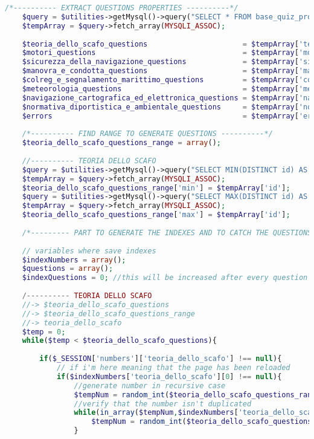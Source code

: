 \begin{lstlisting}[language=php]
	/*---------- EXTRACT QUESTIONS PROPERTIES ----------*/
	$query = $utilities->getMysql()->query("SELECT * FROM base_quiz_properties WHERE (id = '1')");
	$tempArray = $query->fetch_array(MYSQLI_ASSOC);
	
	$teoria_dello_scafo_questions                      = $tempArray['teoria_dello_scafo_questions'];
	$motori_questions                                  = $tempArray['motori_questions'];
	$sicurezza_della_navigazione_questions             = $tempArray['sicurezza_della_navigazione_questions'];
	$manovra_e_condotta_questions                      = $tempArray['manovra_e_condotta_questions'];
	$colreg_e_segnalamento_marittimo_questions         = $tempArray['colreg_e_segnalamento_marittimo_questions'];
	$meteorologia_questions                            = $tempArray['meteorologia_questions'];
	$navigazione_cartografica_ed_elettronica_questions = $tempArray['navigazione_cartografica_ed_elettronica_questions'];
	$normativa_diportistica_e_ambientale_questions     = $tempArray['normativa_diportistica_e_ambientale_questions'];
	$errors                                            = $tempArray['errors'];
	
	/*---------- FIND RANGE TO GENERATE QUESTIONS ----------*/
	$teoria_dello_scafo_questions_range = array();
	
	//---------- TEORIA DELLO SCAFO
	$query = $utilities->getMysql()->query("SELECT MIN(DISTINCT id) AS id FROM base_quiz WHERE (topic = 'TEORIA DELLO SCAFO')");
	$tempArray = $query->fetch_array(MYSQLI_ASSOC);
	$teoria_dello_scafo_questions_range['min'] = $tempArray['id'];
	$query = $utilities->getMysql()->query("SELECT MAX(DISTINCT id) AS id FROM base_quiz WHERE (topic = 'TEORIA DELLO SCAFO')");
	$tempArray = $query->fetch_array(MYSQLI_ASSOC);
	$teoria_dello_scafo_questions_range['max'] = $tempArray['id'];
	
	/*--------- PART TO GENERATE THE INDEXES AND TO CATCH THE QUESTIONS---------*/
	
	// variables where save indexes
	$indexNumbers = array();
	$questions = array();
	$indexQuestions = 0; //this will be increased after every question inserted.
	
	/---------- TEORIA DELLO SCAFO
	//-> $teoria_dello_scafo_questions
	//-> $teoria_dello_scafo_questions_range
	//-> teoria_dello_scafo
	$temp = 0;
	while($temp < $teoria_dello_scafo_questions){
		
		if($_SESSION['numbers']['teoria_dello_scafo'] !== null){
			// if i'm here meaning that the page has been reloaded
			if($indexNumbers['teoria_dello_scafo'][0] !== null){
				//generate number in recursive case
				$tempNum = random_int($teoria_dello_scafo_questions_range['min'], $teoria_dello_scafo_questions_range['max']);
				//verify that the number isn't duplicated
				while(in_array($tempNum,$indexNumbers['teoria_dello_scafo']) || in_array($tempNum,$_SESSION['numbers']['teoria_dello_scafo'])){
					$tempNum = random_int($teoria_dello_scafo_questions_range['min'], $teoria_dello_scafo_questions_range['max']);
				}
				

\end{lstlisting}
